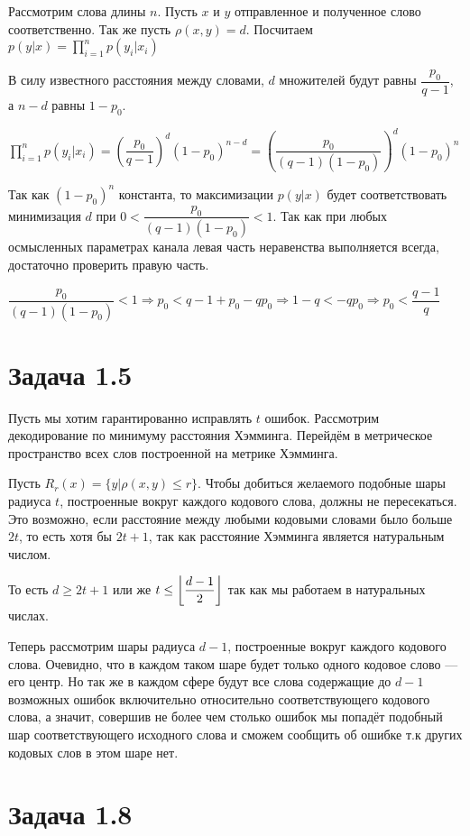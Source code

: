 \documentclass[fontsize=12pt]{article}
\DeclarePairedDelimiter\floor{\lfloor}{\rfloor}
\begin{document}
Рассмотрим слова длины $n$. Пусть $x$ и $y$ отправленное и полученное слово соответственно. Так же пусть $\rho(x, y) = d$. Посчитаем $p(y|x) = \prod\limits_{i=1}^{n}p(y_i|x_i)$

В силу известного расстояния между словами, $d$ множителей будут равны $\dfrac{p_0}{q - 1}$, а $n - d$ равны $1 - p_0$.

$\prod\limits_{i=1}^{n}p(y_i|x_i) = \left(\dfrac{p_0}{q - 1}\right)^d (1 - p_0)^{n - d} = \left(\dfrac{p_0}{(q - 1)(1 - p_0)}\right)^d (1 - p_0)^{n}$

Так как $(1 - p_0)^{n}$ константа, то максимизации $p(y|x)$ будет соответствовать минимизация $d$ при $0 < \dfrac{p_0}{(q - 1)(1 - p_0)} < 1$. Так как при любых осмысленных параметрах канала левая часть неравенства выполняется всегда, достаточно проверить правую часть.

$\dfrac{p_0}{(q - 1)(1 - p_0)} < 1 \Rightarrow 
p_0 < q - 1 + p_0 - qp_0 \Rightarrow
1 - q < -qp_0 \Rightarrow
p_0 < \dfrac{q - 1}{q}
$

\section*{Задача 1.5}

Пусть мы хотим гарантированно исправлять $t$ ошибок. Рассмотрим декодирование по минимуму расстояния Хэмминга. Перейдём в метрическое пространство всех слов построенной на метрике Хэмминга. 

Пусть $R_r(x) = \{y|\rho(x, y) \leq r\}$. Чтобы добиться желаемого подобные шары радиуса $t$, построенные вокруг каждого кодового слова, должны не пересекаться. Это возможно, если расстояние между любыми кодовыми словами было больше $2t$, то есть хотя бы $2t + 1$, так как расстояние Хэмминга является натуральным числом. 

То есть $d \geq 2t + 1$ или же $t \leq \floor*{\dfrac{d - 1}{2}}$ так как мы работаем в натуральных числах.

Теперь рассмотрим шары радиуса $d - 1$, построенные вокруг каждого кодового слова. Очевидно, что в каждом таком шаре будет только одного кодовое слово --- его центр. Но так же в каждом сфере будут все слова содержащие до $d - 1$ возможных ошибок включительно относительно соответствующего кодового слова, а значит, совершив не более чем столько ошибок мы попадёт подобный шар соответствующего исходного слова и сможем сообщить об ошибке т.к других кодовых слов в этом шаре нет.

\section*{Задача 1.8}
\end{document}
